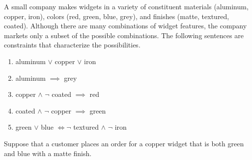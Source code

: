 \documentclass[addpoints]{exam}
\begin{document}
\begin{questions}

\question[5] A small company makes widgets in a variety of constituent materials (aluminum, copper, iron), colors (red, green, blue, grey), and finishes (matte, textured, coated). Although there are many combinations of widget features, the company markets only a subset of the possible combinations. The following sentences are constraints that characterize the possibilities. 
  \begin{enumerate}
  \item aluminum $\lor$ copper $\lor$ iron
  \item aluminum $\implies$ grey
  \item copper $\land$ $\neg$ coated $\implies$ red
  \item coated $\land$ $\neg$ copper $\implies$ green
  \item green $\lor$ blue $\iff \neg$ textured $\land$ $\neg$ iron
  \end{enumerate}
  Suppose that a customer places an order for a copper widget that is both green and blue with a matte finish.
\end{questions}
\end{document}
